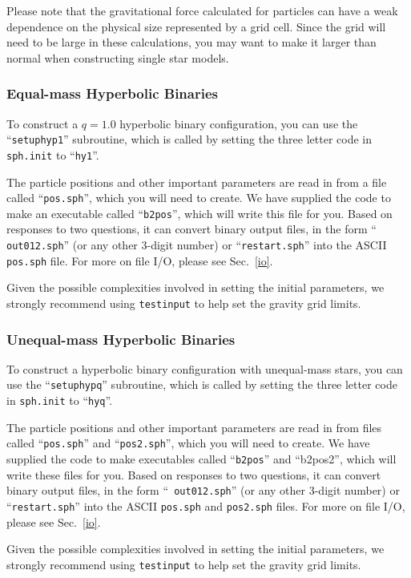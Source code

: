 Please note that the gravitational force calculated for particles can
have a weak dependence on the physical size represented by a grid
cell.  Since the grid will need to be large in these calculations, you
may want to make it larger than normal when constructing single star models.

\subsubsection{Equal-mass Hyperbolic Binaries}
\label{in:hy:1}
To construct a $q=1.0$ hyperbolic binary configuration,
you can use the
``{\tt setuphyp1}'' subroutine, which is called by setting the three
letter code in {\tt sph.init} to ``{\tt hy1}''.

The particle positions and other important parameters are read in from
a file called ``{\tt pos.sph}'', which you will need to create.  We
have supplied the code to make an executable called ``{\tt b2pos}'',
which will write this file for you.  Based on responses to two
questions, it can convert binary output files, in the form ``{\tt
out012.sph}'' (or any other 3-digit number) or ``{\tt restart.sph}'' 
into the ASCII {\tt pos.sph} file.  For more on file I/O, please see
Sec.~\ref{io}.  
 
Given the possible complexities involved in setting the initial
parameters, we strongly recommend using {\tt testinput} to help set
the gravity grid limits.

\subsubsection{Unequal-mass Hyperbolic Binaries}
\label{in:hy:q}
To construct a hyperbolic binary configuration with unequal-mass stars,
you can use the
``{\tt setuphypq}'' subroutine, which is called by setting the three
letter code in {\tt sph.init} to ``{\tt hyq}''.

The particle positions and other important parameters are read in from
files called ``{\tt pos.sph}'' and ``{\tt pos2.sph}'', 
which you will need to create.  We
have supplied the code to make executables called ``{\tt b2pos}'' and
``{b2pos2}'',
which will write these files for you.  Based on responses to two
questions, it can convert binary output files, in the form ``{\tt
out012.sph}'' (or any other 3-digit number) or ``{\tt restart.sph}'' 
into the ASCII {\tt pos.sph} and {\tt pos2.sph} files.  
For more on file I/O, please see Sec.~\ref{io}.  

Given the possible complexities involved in setting the initial
parameters, we strongly recommend using {\tt testinput} to help set
the gravity grid limits.

